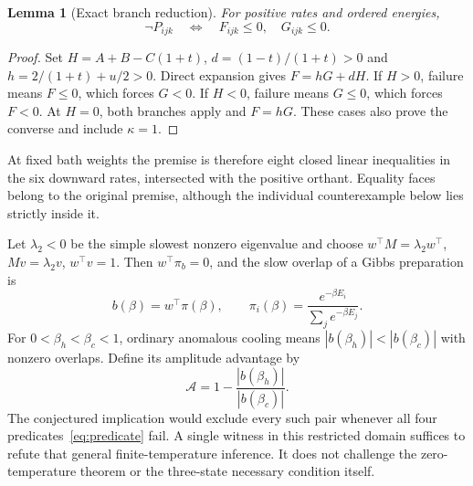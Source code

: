 \documentclass[11pt]{article}
\newtheorem{lemma}{Lemma}
\begin{document}
\begin{lemma}[Exact branch reduction]\label{lem:cone}
For positive rates and ordered energies,
\[
 \neg P_{ijk}\quad\Longleftrightarrow\quad F_{ijk}\leq0,
 \quad G_{ijk}\leq0.
\]
\end{lemma}
\begin{proof}
Set $H=A+B-C(1+t)$, $d=(1-t)/(1+t)>0$ and
$h=2/(1+t)+u/2>0$. Direct expansion gives $F=hG+dH$.
If $H>0$, failure means $F\leq0$, which forces $G<0$.
If $H<0$, failure means $G\leq0$, which forces $F<0$.
At $H=0$, both branches apply and $F=hG$. These cases also prove the
converse and include $\kappa=1$.
\end{proof}
At fixed bath weights the premise is therefore eight closed linear
inequalities in the six downward rates, intersected with the positive
orthant. Equality faces belong to the original premise, although the
individual counterexample below lies strictly inside it.

Let $\lambda_2<0$ be the simple slowest nonzero eigenvalue and choose
$w^\top M=\lambda_2w^\top$, $Mv=\lambda_2v$, $w^\top v=1$.
Then $w^\top\pi_b=0$, and the slow overlap of a Gibbs preparation is
\begin{equation}\label{eq:overlap}
 b(\beta)=w^\top\pi(\beta),\qquad
 \pi_i(\beta)=\frac{e^{-\beta E_i}}{\sum_je^{-\beta E_j}}.
\end{equation}
For $0<\beta_h<\beta_c<1$, ordinary anomalous cooling means
$|b(\beta_h)|<|b(\beta_c)|$ with nonzero overlaps. Define its amplitude
advantage by
\begin{equation}\label{eq:advantage}
 \mathcal A=1-\frac{|b(\beta_h)|}{|b(\beta_c)|}.
\end{equation}
The conjectured implication would exclude every such pair whenever all
four predicates~\eqref{eq:predicate} fail. A single witness in this
restricted domain suffices to refute that general finite-temperature
inference. It does not challenge the zero-temperature theorem or the
three-state necessary condition itself.
\end{document}
